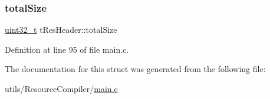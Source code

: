 \subsubsection{\texorpdfstring{total\+Size}{totalSize}}
{\footnotesize\ttfamily \hyperlink{stdint_8h_a435d1572bf3f880d55459d9805097f62}{uint32\+\_\+t} t\+Res\+Header\+::total\+Size}



Definition at line 95 of file main.\+c.



The documentation for this struct was generated from the following file\+:\begin{DoxyCompactItemize}
\item 
utils/\+Resource\+Compiler/\hyperlink{utils_2ResourceCompiler_2main_8c}{main.\+c}\end{DoxyCompactItemize}
